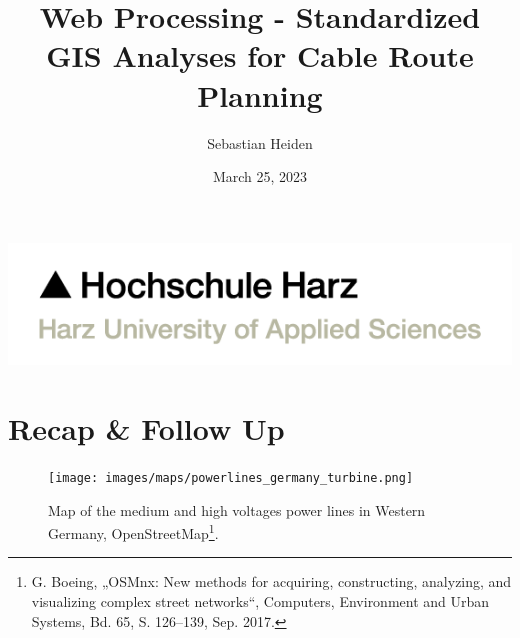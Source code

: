 \documentclass[usenames,dvipsnames,aspectratio=169]{beamer}
\title{Web Processing - Standardized GIS Analyses for Cable Route Planning}
\author{Sebastian Heiden}
\institute{Harz University of Applied Sciences}
\date{March 25, 2023}
\begin{document}
	
	
	
	\begin{frame}[plain]
		\includegraphics[scale=0.21]{images/3-HSH-Logo-RGB-en.png}
		\maketitle
	\end{frame}
	
	
	\section{Recap \& Follow Up}
	
	\begin{frame}
		\begin{figure}
			\centering
			\texttt{[image: images/maps/powerlines\_germany\_turbine.png]}
			\caption{Map of the medium and high voltages power lines in Western Germany, OpenStreetMap\footnote{G. Boeing, „OSMnx: New methods for acquiring, constructing, analyzing, and visualizing complex street networks“, Computers, Environment and Urban Systems, Bd. 65, S. 126–139, Sep. 2017.}.}
			\label{fig:PowerLines}
		\end{figure}
	\end{frame}
	
\end{document}
